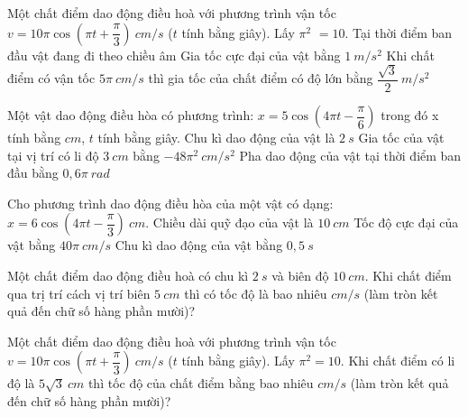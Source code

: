 \begin{ex}
Một chất điểm dao động điều hoà với phương trình vận tốc $v=10 \pi \cos (\pi t+\dfrac{\pi}{3})\ cm/s$ ($t$ tính bằng giây). Lấy $\pi^2$ $=10$.
{Tại thời điểm ban đầu vật đang đi theo chiều âm}
{\True Gia tốc cực đại của vật bằng $1 \ m/s^2$}
{\True Khi chất điểm có vận tốc $5 \pi\ cm/s$ thì gia tốc của chất điểm có độ lớn bằng $\dfrac{\sqrt{3}}{2} \ m/s^2$}
\loigiai{
\begin{itemchoice}
\itemch
\itemch
\itemch
\itemch
\end{itemchoice}
}
\end{ex} 
\begin{ex}
Một vật dao động điều hòa có phương trình: $x = 5 \cos(4\pi t - \dfrac{\pi}{6})$ trong đó x tính bằng $cm$, $t$ tính bằng giây.
{Chu kì dao động của vật là $2\ s$}
{\True Gia tốc của vật tại vị trí có li độ $3\ cm$ bằng $-48\pi^{2}\ cm/s^2$}
{Pha dao động của vật tại thời điểm ban đầu bằng $0,6\pi\ rad$}
\loigiai{
\begin{itemchoice}
\itemch
\itemch
\itemch
\itemch
\end{itemchoice}
}
\end{ex}
\begin{ex}
Cho phương trình dao động điều hòa của một vật có dạng: $x=6 \cos \left(4 \pi t-\dfrac{\pi}{3}\right)\ cm$.
{Chiều dài quỹ đạo của vật là $10\ cm$}
{Tốc độ cực đại của vật bằng $40\pi\ cm/s$}
{\True Chu kì dao động của vật bằng $0,5\ s$}
\loigiai{ }
\end{ex}

\setcounter{ex}{0}
\PhanIII
\begin{ex}
Một chất điểm dao động điều hoà có chu kì $2 \ s$ và biên độ $10 \ cm$. Khi chất điểm qua trị trí cách vị trí biên $5 \ cm$ thì có tốc độ là bao nhiêu $cm/s$ (làm tròn kết quả đến chữ số hàng phần mười)?
\end{ex} 
\begin{ex}
Một chất điểm dao động điều hoà với phương trình vận tốc $v=10 \pi \cos (\pi t+\dfrac{\pi}{3})\ cm/s$ ($t$ tính bằng giây). Lấy $\pi^2=10$. Khi chất điểm có li độ là $5 \sqrt{3} \ cm$ thì tốc độ của chất điểm bằng bao nhiêu $cm/s$ (làm tròn kết quả đến chữ số hàng phần mười)? 
\loigiai{
}
\end{ex} 

